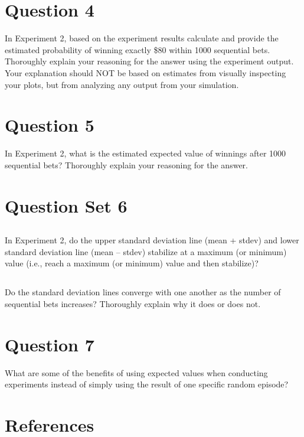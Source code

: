 \documentclass[
	letterpaper, %
]{jdf}
\begin{document}
\section{Question 4}
In Experiment 2, based on the experiment results calculate and provide the estimated probability of winning exactly \$80 within 1000 sequential bets. Thoroughly explain your reasoning for the answer using the experiment output. Your explanation should NOT be based on estimates from visually inspecting your plots, but from analyzing any output from your simulation.

\section{Question 5}
In Experiment 2, what is the estimated expected value of winnings after 1000 sequential bets? Thoroughly explain your reasoning for the answer. 

\section{Question Set 6}

\subsection{}
In Experiment 2, do the upper standard deviation line (mean + stdev) and lower standard deviation line (mean – stdev) stabilize at a maximum (or minimum) value (i.e., reach a maximum (or minimum) value and then stabilize)?

\subsection{}
Do the standard deviation lines converge with one another as the number of sequential bets increases? Thoroughly explain why it does or does not. 

\section{Question 7}
What are some of the benefits of using expected values when conducting experiments instead of simply using the result of one specific random episode? 

\section{References}
\printbibliography[heading=none]
\end{document}
